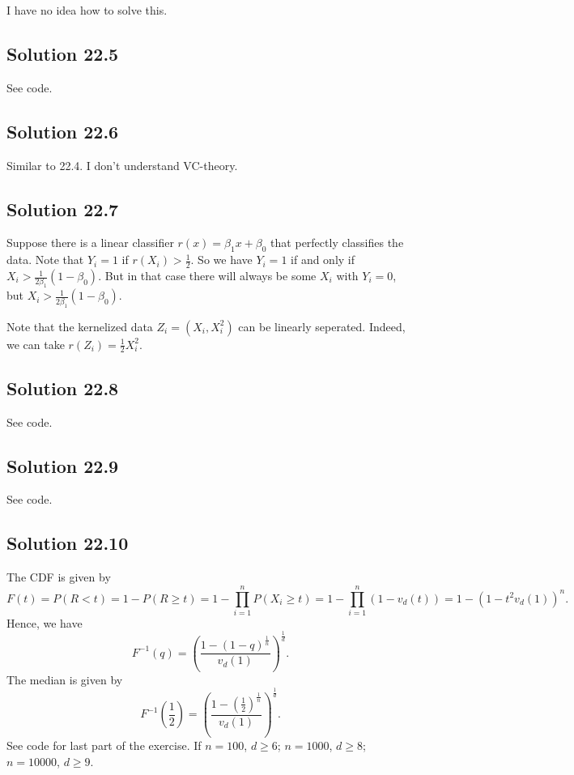 I have no idea how to solve this.


\subsection*{Solution 22.5}

See code.


\subsection*{Solution 22.6}

Similar to 22.4. I don't understand VC-theory.


\subsection*{Solution 22.7}

Suppose there is a linear classifier $r(x) = \beta_1 x + \beta_0$ that perfectly classifies the data.
Note that $Y_i = 1$ if $r(X_i) > \frac{1}{2}$.
So we have $Y_i = 1$ if and only if $X_i > \frac{1}{2 \beta_1} (1 - \beta_0)$.
But in that case there will always be some $X_i$ with $Y_i = 0$, but $X_i > \frac{1}{2 \beta_1} (1 - \beta_0)$.

Note that the kernelized data $Z_i = (X_i, X_i^2)$ can be linearly seperated.
Indeed, we can take $r(Z_i) = \frac{1}{2} X_i^2$.


\subsection*{Solution 22.8}

See code.


\subsection*{Solution 22.9}

See code.


\subsection*{Solution 22.10}

The CDF is given by
\begin{equation*}
    F(t) = P(R < t)
        = 1 - P(R \geq t)
        = 1 - \prod_{i = 1}^n P(X_i \geq t)
        = 1 - \prod_{i = 1}^n (1 - v_d(t))
        = 1 - (1 - t^2 v_d(1))^n.
\end{equation*}
Hence, we have
\begin{equation*}
    F^{-1}(q) = \left(\frac{1 - (1 - q)^{\frac{1}{n}}}{v_d(1)}\right)^{\frac{1}{d}}.
\end{equation*}
The median is given by
\begin{equation*}
    F^{-1}\left(\frac{1}{2}\right) = \left(\frac{1 - (\frac{1}{2})^{\frac{1}{n}}}{v_d(1)}\right)^{\frac{1}{d}}.
\end{equation*}
See code for last part of the exercise.
If $n = 100$, $d \geq 6$; $n = 1000$, $d \geq 8$; $n = 10000$, $d \geq 9$.
